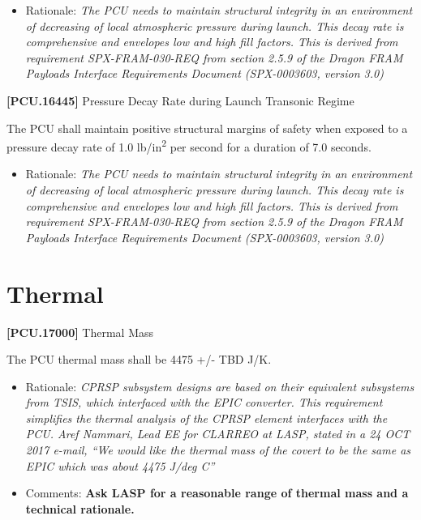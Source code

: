 \documentclass[12pt,oneside,oldfontcommands]{memoir}
\begin{document}
\begin{itemize}
\item{} Rationale: \emph{The PCU needs to maintain structural integrity in an environment of decreasing of local atmospheric pressure during launch. This decay rate is comprehensive and envelopes low and high fill factors. This is derived from requirement SPX-FRAM-030-REQ from section 2.5.9 of the Dragon FRAM Payloads Interface Requirements Document (SPX-0003603, version 3.0)}

\end{itemize}

\textbf{[PCU.16445]} Pressure Decay Rate during Launch Transonic Regime

The \gls{PCU} shall maintain positive structural margins of safety when exposed to a pressure decay rate of 1.0 lb\slash in\textsuperscript{2} per second for a duration of 7.0 seconds.

\begin{itemize}
\item{} Rationale: \emph{The PCU needs to maintain structural integrity in an environment of decreasing of local atmospheric pressure during launch. This decay rate is comprehensive and envelopes low and high fill factors. This is derived from requirement SPX-FRAM-030-REQ from section 2.5.9 of the Dragon FRAM Payloads Interface Requirements Document (SPX-0003603, version 3.0)}

\end{itemize}

\section{Thermal}
\label{thermal}

\textbf{[PCU.17000]} Thermal Mass

The \gls{PCU} thermal mass shall be 4475 +\slash - TBD\label{tbx_14} J\slash K.

\begin{itemize}
\item{} Rationale: \emph{CPRSP subsystem designs are based on their equivalent subsystems from TSIS, which interfaced with the EPIC converter. This requirement simplifies the thermal analysis of the CPRSP element interfaces with the PCU. Aref Nammari, Lead EE for CLARREO at LASP, stated in a 24 OCT 2017 e-mail, ``We would like the thermal mass of the covert to be the same as EPIC which was about 4475 J\slash deg C''}

\item{} Comments: \textbf{Ask LASP for a reasonable range of thermal mass and a technical rationale.}

\end{itemize}
\end{document}
